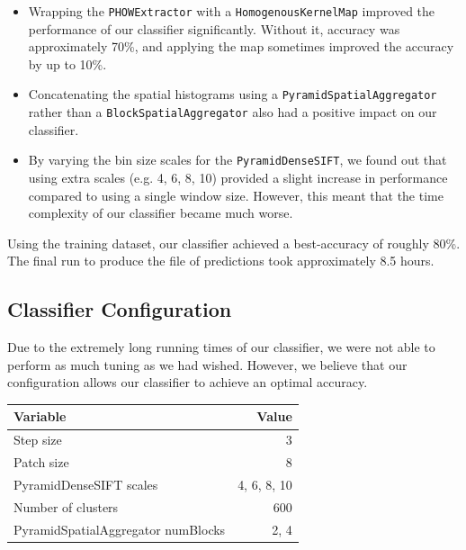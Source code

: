 \documentclass[a4paper]{article}
\begin{document}
\begin{itemize}
\item Wrapping the \texttt{PHOWExtractor} with a \texttt{HomogenousKernelMap} improved the performance of our classifier significantly. Without it, accuracy was approximately 70\%, and applying the map sometimes improved the accuracy by up to 10\%.\\
\item Concatenating the spatial histograms using a \texttt{PyramidSpatialAggregator} rather than a \texttt{BlockSpatialAggregator} also had a positive impact on our classifier.\\
\item By varying the bin size scales for the \texttt{PyramidDenseSIFT}, we found out that using extra scales (e.g. 4, 6, 8, 10) provided a slight increase in performance compared to using a single window size. However, this meant that the time complexity of our classifier became much worse.\\
\end{itemize}

Using the training dataset, our classifier achieved a best-accuracy of roughly 80\%. The final run to produce the file of predictions took approximately 8.5 hours.

\subsection{Classifier Configuration}
Due to the extremely long running times of our classifier, we were not able to perform as much tuning as we had wished. However, we believe that our configuration allows our classifier to achieve an optimal accuracy.\\

\begin{center}
    \def\arraystretch{1.5}%
    \begin{tabular}{ | l | r |}
    \hline
    \textbf{Variable} & \textbf{Value} \\ \hline
    Step size & 3 \\ \hline
    Patch size & 8 \\ \hline
    PyramidDenseSIFT scales & 4, 6, 8, 10 \\ \hline
    Number of clusters & 600 \\ \hline
    PyramidSpatialAggregator numBlocks & 2, 4 \\ \hline
    \end{tabular}
\end{center}
\end{document}
